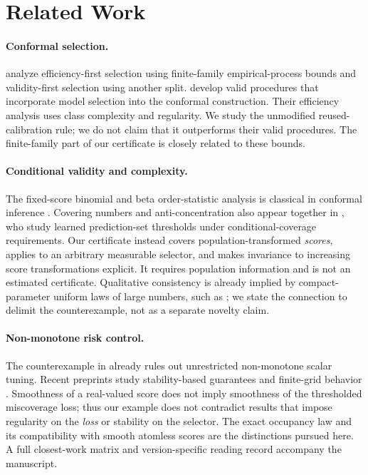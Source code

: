 \documentclass{article}
\begin{document}
\section{Related Work}

\paragraph{Conformal selection.}
\citet{yang2025} analyze efficiency-first selection using finite-family empirical-process bounds and validity-first selection using another split. \citet{liang2026} develop valid procedures that incorporate model selection into the conformal construction. Their efficiency analysis uses class complexity and regularity. We study the unmodified reused-calibration rule; we do not claim that it outperforms their valid procedures. The finite-family part of our certificate is closely related to these bounds.

\paragraph{Conditional validity and complexity.}
The fixed-score binomial and beta order-statistic analysis is classical in conformal inference \citep{vovk2012}. Covering numbers and anti-concentration also appear together in \citet{kiyani2024}, who study learned prediction-set thresholds under conditional-coverage requirements. Our certificate instead covers population-transformed \emph{scores}, applies to an arbitrary measurable selector, and makes invariance to increasing score transformations explicit. It requires population information and is not an estimated certificate. Qualitative consistency is already implied by compact-parameter uniform laws of large numbers, such as \citet[Lemma 2.4]{newey1994}; we state the connection to delimit the counterexample, not as a separate novelty claim.

\paragraph{Non-monotone risk control.}
The counterexample in \citet{crc2024} already rules out unrestricted non-monotone scalar tuning. Recent preprints study stability-based guarantees \citep{angelopoulos2026} and finite-grid behavior \citep{aldirawi2026}. Smoothness of a real-valued score does not imply smoothness of the thresholded miscoverage loss; thus our example does not contradict results that impose regularity on the \emph{loss} or stability on the selector. The exact occupancy law and its compatibility with smooth atomless scores are the distinctions pursued here. A full closest-work matrix and version-specific reading record accompany the manuscript.
\end{document}
